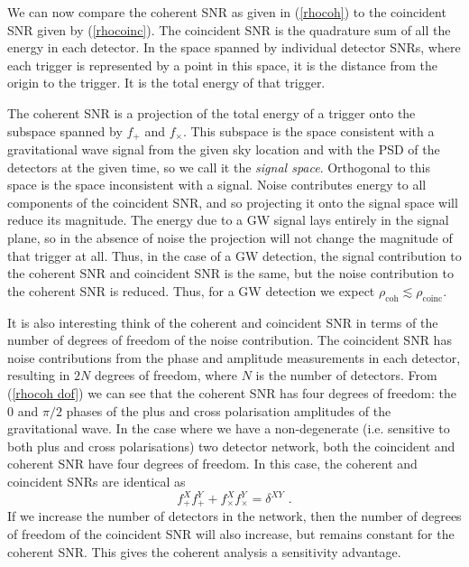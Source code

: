 \documentclass[11pt]{cuthesis}
\newcommand{\fs}{\text{ .}}
\begin{document}
We can now compare the coherent SNR as given in (\ref{rhocoh}) to the coincident SNR given by (\ref{rhocoinc}). The coincident SNR is the quadrature sum of all the energy in each detector. In the space spanned by individual detector SNRs, where each trigger is represented by a point in this space, it is the distance from the origin to the trigger. It is the total energy of that trigger. 

The coherent SNR is a projection of the total energy of a trigger onto the subspace spanned by $f_+$ and $f_\times$. This subspace is the space consistent with a gravitational wave signal from the given sky location and with the PSD of the detectors at the given time, so we call it the \textit{signal space}. Orthogonal to this space is the space inconsistent with a signal. Noise contributes energy to all components of the coincident SNR, and so projecting it onto the signal space will reduce its magnitude. The energy due to a GW signal lays entirely in the signal plane, so in the absence of noise the projection will not change the magnitude of that trigger at all. Thus, in the case of a GW detection, the signal contribution to the coherent SNR and coincident SNR is the same, but the noise contribution to the coherent SNR is reduced. Thus, for a GW detection we expect $\rho_\text{coh} \lesssim \rho_\text{coinc}$. 

It is also interesting think of the coherent and coincident SNR in terms of the number of degrees of freedom of the noise contribution. The coincident SNR has noise contributions from the phase and amplitude measurements in each detector, resulting in $2N$ degrees of freedom, where $N$ is the number of detectors. From (\ref{rhocoh dof}) we can see that the coherent SNR has four degrees of freedom: the $0$ and $\pi/2$ phases of the plus and cross polarisation amplitudes of the gravitational wave. In the case where we have a non-degenerate (i.e. sensitive to both plus and cross polarisations) two detector network, both the coincident and coherent SNR have four degrees of freedom. In this case, the coherent and coincident SNRs are identical as
\begin{equation}
f^X_{+}f^Y_{+}+f^X_{\times}f^Y_{\times}=\delta^{XY} \fs
\end{equation}
If we increase the number of detectors in the network, then the number of degrees of freedom of the coincident SNR will also increase, but remains constant for the coherent SNR. This gives the coherent analysis a sensitivity advantage.
\end{document}
